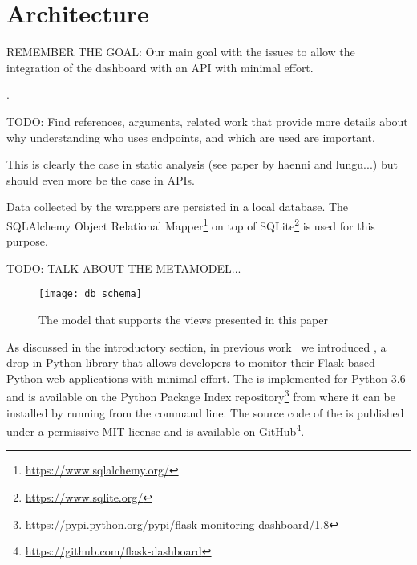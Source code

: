 
\section{Architecture}

REMEMBER THE GOAL: Our main goal with the \tool issues to allow the integration of the dashboard with an API with minimal effort.




. 

TODO: Find references, arguments, related work
that provide more details about why understanding
who uses endpoints, and which are used are important.

This is clearly the case in static analysis (see paper
by haenni and lungu...) but should even more be the
case in APIs.




  \newpage


  Data collected by the wrappers are persisted in a local database. The SQLAlchemy Object Relational Mapper\footnote{\url{https://www.sqlalchemy.org/}} on top of SQLite\footnote{\url{https://www.sqlite.org/}} is used for this purpose.

TODO: TALK ABOUT THE METAMODEL...


    \begin{figure}[ht!]
      \centering
        \texttt{[image: db\_schema]}
        \caption{The model that supports the views presented in this paper}
        \label{fig:sep}
    \end{figure}

  As discussed in the introductory section, in previous work~\cite{vogel2017low} we introduced \tool, a drop-in Python library that allows developers to monitor their Flask-based Python web applications with minimal effort.
%
  The \tool is implemented for Python 3.6 and is available on the Python Package Index repository\footnote{\url{https://pypi.python.org/pypi/flask-monitoring-dashboard/1.8}} from where it can be installed by running \install from the command line. 
%  
  The source code of the \tool is published under a permissive MIT license and is available on GitHub\footnote{\url{https://github.com/flask-dashboard}}.
  
  


